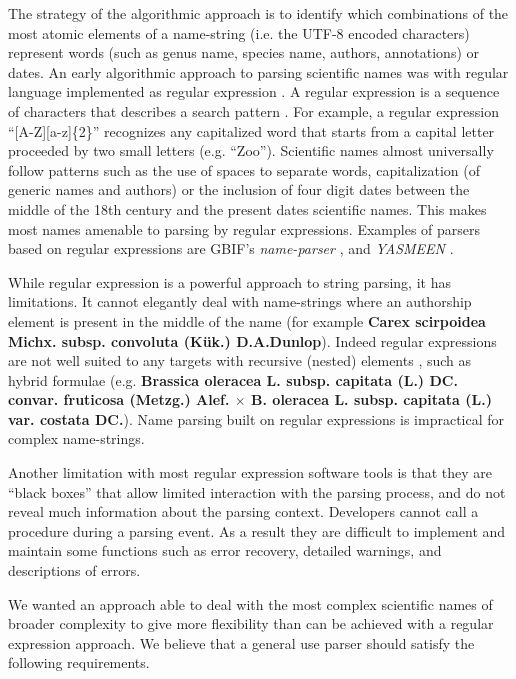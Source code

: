 \documentclass{bmcart}
\begin{document}
The strategy of the algorithmic approach is to identify which combinations of the most atomic elements of a name-string (i.e. the UTF-8 encoded characters) represent words (such as genus name, species name, authors, annotations) or dates.  An early algorithmic approach to parsing scientific names was with regular
language implemented as regular expression \cite{Leary2007}. A regular expression
is a sequence of characters that describes a search pattern
\cite{aho1992foundations}. For example, a regular expression ``[A-Z][a-z]\{2\}''
recognizes any capitalized word that starts from a capital letter proceeded by two small letters (e.g. ``Zoo''). Scientific names almost universally follow patterns such as the use of spaces to separate words, capitalization (of generic names and authors) or the inclusion of four digit dates between the middle of the 18th century and the present dates scientific names. This makes most names amenable to parsing by regular expressions.  Examples of
parsers based on regular expressions are GBIF's \textit{name-parser}
\cite{gbifNameParser}, and \textit{YASMEEN} \cite{VandenBerghe2015}.

While regular expression is a powerful approach to string parsing,  it has
limitations. It cannot elegantly deal with name-strings where an authorship element is present in the middle of the name (for example
\textbf{Carex scirpoidea Michx. subsp.  convoluta (Kük.) D.A.Dunlop}).  Indeed regular expressions are not well suited to any targets 
with recursive (nested) elements \cite{yu1997handbook}, such as hybrid formulae (e.g. \textbf{Brassica oleracea L.
subsp.  capitata (L.) DC. convar. fruticosa (Metzg.) Alef.  $\times$ B.
oleracea L. subsp. capitata (L.) var.  costata DC.}). Name parsing built on
regular expressions is impractical for complex name-strings.

Another limitation with most regular expression software tools is that they are ``black
boxes'' that allow limited interaction with the parsing process, and do not reveal much information about the parsing context. Developers cannot call a
procedure during a parsing event. As a result they are difficult to implement and maintain some functions such as error recovery, detailed warnings, and descriptions of errors.

We wanted an approach able to deal with the most complex scientific names of broader
complexity to give more flexibility than can be achieved with a regular expression approach.  We
believe that a general use parser should satisfy the following requirements.
\end{document}
